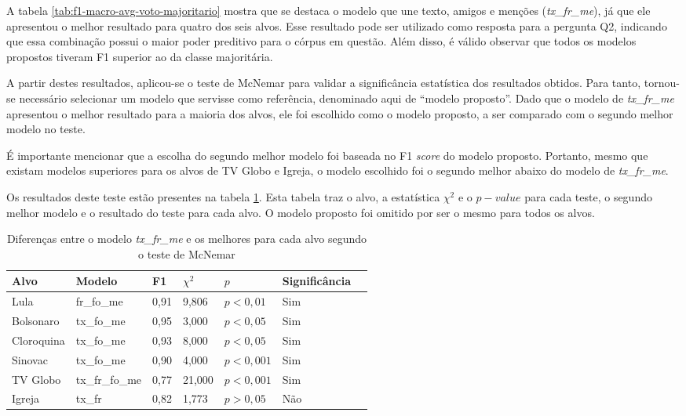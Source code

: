 \documentclass[
	12pt, oneside, a4paper, english, brazil
]{abntex2ppgsi}
\begin{document}
A tabela \ref{tab:f1-macro-avg-voto-majoritario} mostra que se destaca o modelo que une texto, amigos e menções ({\em tx\_fr\_me}), já que ele apresentou o melhor resultado para quatro dos seis alvos. Esse resultado pode ser utilizado como resposta para a pergunta Q2, indicando que essa combinação possui o maior poder preditivo para o córpus em questão. Além disso, é válido observar que todos os modelos propostos tiveram F1 superior ao da classe majoritária.

A partir destes resultados, aplicou-se o teste de McNemar \cite{mcnemar} para validar a significância estatística dos resultados obtidos. Para tanto, tornou-se necessário selecionar um modelo que servisse como referência, denominado aqui de ``modelo proposto''. Dado que o modelo de {\em tx\_fr\_me} apresentou o melhor resultado para a maioria dos alvos, ele foi escolhido como o modelo proposto, a ser comparado com o segundo melhor modelo no teste.

É importante mencionar que a escolha do segundo melhor modelo foi baseada no F1 {\em score} do modelo proposto. Portanto, mesmo que existam modelos superiores para os alvos de TV Globo e Igreja, o modelo escolhido foi o segundo melhor abaixo do modelo de {\em tx\_fr\_me}.

Os resultados deste teste estão presentes na tabela \ref{tab:mc-nemar}. Esta tabela traz o alvo, a estatística $\chi^2$ e o $p-value$ para cada teste, o segundo melhor modelo e o resultado do teste para cada alvo. O modelo proposto foi omitido por ser o mesmo para todos os alvos.

\begin{table}[ht]
\centering
\caption{Diferenças entre o modelo {\em tx\_fr\_me} e os melhores para cada alvo segundo o teste de McNemar}
\label{tab:mc-nemar}
\begin{tabular}{ lllllll }
\hline
Alvo & Modelo & F1 & $\chi^2$ & $p$ & Significância \\ \hline
Lula & fr\_fo\_me & 0,91 & 9,806 & $p < 0,01$ & Sim \\
Bolsonaro & tx\_fo\_me & 0,95 & 3,000 & $p < 0,05$ & Sim \\
Cloroquina & tx\_fo\_me & 0,93 & 8,000 & $p < 0,05$ & Sim \\
Sinovac & tx\_fo\_me & 0,90 & 4,000 & $p < 0,001$ & Sim \\
TV Globo & tx\_fr\_fo\_me & 0,77 & 21,000 & $p < 0,001$ & Sim \\
Igreja & tx\_fr & 0,82 & 1,773 & $p > 0,05$ & Não \\
\hline
\end{tabular}
\end{table}
\end{document}

